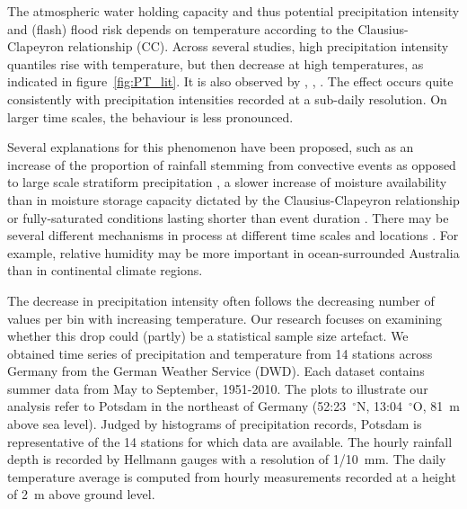 \documentclass[a4paper]{article}
\begin{document}
\begin{multicols}{2}

The atmospheric water holding capacity and thus potential precipitation intensity and (flash) flood risk depends on temperature according to the Clausius-Clapeyron relationship (CC). 
Across several studies, high precipitation intensity quantiles rise with temperature, but then decrease at high temperatures, as indicated in figure~\ref{fig:PT_lit}.
It is also observed by \citet{brandsma_statistical_1997}, \citet{klein_tank_dependence_1993},  \citet{panthou_relationship_2014}.
The effect occurs quite consistently with precipitation intensities recorded at a sub-daily resolution.
On larger time scales, the behaviour is less pronounced.

Several explanations for this phenomenon have been proposed, such as an increase of the proportion of rainfall stemming from convective events as opposed to large scale stratiform precipitation \citep{haerter_unexpected_2009}, a slower increase of moisture availability than in moisture storage capacity dictated by the Clausius-Clapeyron relationship \citep{berg_seasonal_2009} or fully-saturated conditions lasting shorter than event duration \citep{hardwick_jones_observed_2010}. 
There may be several different mechanisms in process at different time scales and locations \citep{utsumi_does_2011}.
For example, relative humidity may be more important in ocean-surrounded Australia than in continental climate regions.

The decrease in precipitation intensity often follows the decreasing number of values per bin with increasing temperature.
Our research focuses on examining whether this drop could (partly) be a statistical sample size artefact. 
We obtained time series of precipitation and temperature from 14 stations across Germany from the German Weather Service (DWD).
Each dataset contains summer data from May to September, 1951-2010.
The plots to illustrate our analysis refer to Potsdam in the northeast of Germany (52:23~$^{\circ}$N,  13:04~$^{\circ}$O,  81~m above sea level).
Judged by histograms of precipitation records, Potsdam is representative of the 14 stations for which data are available.
The hourly rainfall depth is recorded by Hellmann gauges with a resolution of 1/10~mm.
The daily temperature average is computed from hourly measurements recorded at a height of 2~m above ground level.
\end{multicols}
\end{document}
